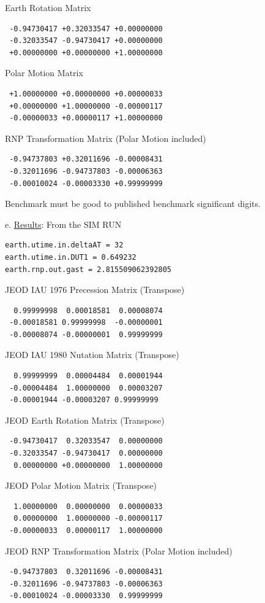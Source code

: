 Earth Rotation Matrix
\begin{verbatim}
 -0.94730417 +0.32033547 +0.00000000
 -0.32033547 -0.94730417 +0.00000000
 +0.00000000 +0.00000000 +1.00000000
\end{verbatim}

Polar Motion Matrix
\begin{verbatim}
 +1.00000000 +0.00000000 +0.00000033
 +0.00000000 +1.00000000 -0.00000117
 -0.00000033 +0.00000117 +1.00000000
\end{verbatim}

RNP Transformation Matrix (Polar Motion included)
\begin{verbatim}
 -0.94737803 +0.32011696 -0.00008431
 -0.32011696 -0.94737803 -0.00006363
 -0.00010024 -0.00003330 +0.99999999
\end{verbatim}


Benchmark must be good to published benchmark significant digits.\newline


e. \underline{Results}:\newline
From the SIM RUN
\begin{verbatim}
earth.utime.in.deltaAT = 32
earth.utime.in.DUT1 = 0.649232
earth.rnp.out.gast = 2.815509062392805
\end{verbatim}

JEOD IAU 1976 Precession Matrix (Transpose)
\begin{verbatim}
  0.99999998  0.00018581  0.00008074
 -0.00018581 0.99999998  -0.00000001
 -0.00008074 -0.00000001  0.99999999
\end{verbatim}

JEOD IAU 1980 Nutation Matrix (Transpose)
\begin{verbatim}
  0.99999999  0.00004484  0.00001944
 -0.00004484  1.00000000  0.00003207
 -0.00001944 -0.00003207 0.99999999
\end{verbatim}

JEOD Earth Rotation Matrix (Transpose)
\begin{verbatim}
 -0.94730417  0.32033547  0.00000000
 -0.32033547 -0.94730417  0.00000000
  0.00000000 +0.00000000  1.00000000
\end{verbatim}

JEOD Polar Motion Matrix (Transpose)
\begin{verbatim}
  1.00000000  0.00000000  0.00000033
  0.00000000  1.00000000 -0.00000117
 -0.00000033  0.00000117  1.00000000
\end{verbatim}


JEOD RNP Transformation Matrix (Polar Motion included)
\begin{verbatim}
 -0.94737803  0.32011696 -0.00008431
 -0.32011696 -0.94737803 -0.00006363
 -0.00010024 -0.00003330  0.99999999
\end{verbatim}

